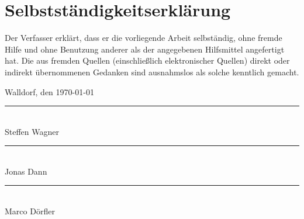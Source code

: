 \newpage
\thispagestyle{empty}
\section*{Selbstständigkeitserklärung}
\vspace{15mm}
 
Der Verfasser erklärt, dass er die vorliegende Arbeit selbständig, 
ohne fremde Hilfe und ohne Benutzung anderer als der angegebenen Hilfsmittel
angefertigt hat. 
Die aus fremden Quellen (einschließlich elektronischer Quellen) direkt oder 
indirekt übernommenen Gedanken sind ausnahmslos als solche kenntlich gemacht. 
 
\vspace{3cm} 
Walldorf, den \today
\vspace{1cm} 	
\begin{multicols}{3}
	\vspace{2cm}
	\rule{5cm}{.1pt}\\
	\vspace{5mm}
	Steffen Wagner
	
	\rule{5cm}{.1pt}\\
	\vspace{5mm}
	Jonas Dann

	\rule{5cm}{.1pt}\\
	\vspace{5mm}
	Marco Dörfler
\end{multicols}

\vspace{5cm}